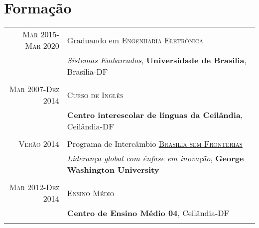 \documentclass[a4paper,10pt]{article} %
\begin{document}
\section{Formação}

\begin{tabular}{rl}	


\textsc{Mar} 2015-\textsc{Mar} 2020& Graduando em \textsc{}\textsc{Engenharia Eletrônica}\\
& \small\emph{Sistemas Embarcados}, \normalsize\textbf{Universidade de Brasilia}, Brasília-DF\\
&\\


\textsc{Mar} 2007-\textsc{Dez} 2014&\textsc{}\textsc{Curso de Inglês}\\
& \normalsize\textbf{Centro interescolar de línguas da Ceilândia}, Ceilândia-DF\\
&\\


\textsc{Verão} 2014 & Programa de Intercâmbio \textsc{}\textsc{\href{https://summer.gwu.edu/brasilia-without-borders}{Brasilia sem Fronterias}}\\
& \small\emph{Liderança global com ênfase em inovação}, \normalsize\textbf{George Washington University}\\
&\\

\textsc{Mar} 2012-\textsc{Dez} 2014&  \textsc{}\textsc{Ensino Médio}\\
& \small\emph{}\normalsize\textbf{Centro de Ensino Médio 04},  Ceilândia-DF\\
&\\

\end{tabular}


\end{document}

